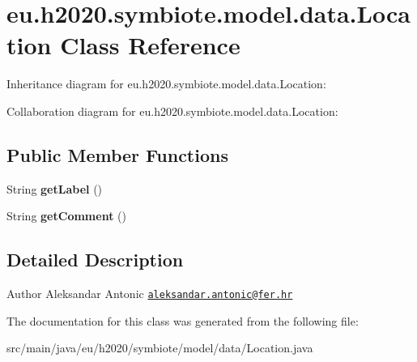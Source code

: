 \hypertarget{classeu_1_1h2020_1_1symbiote_1_1model_1_1data_1_1Location}{}\section{eu.\+h2020.\+symbiote.\+model.\+data.\+Location Class Reference}
\label{classeu_1_1h2020_1_1symbiote_1_1model_1_1data_1_1Location}


Inheritance diagram for eu.\+h2020.\+symbiote.\+model.\+data.\+Location\+:


Collaboration diagram for eu.\+h2020.\+symbiote.\+model.\+data.\+Location\+:
\subsection*{Public Member Functions}
\begin{DoxyCompactItemize}
\item 
\mbox{\label{classeu_1_1h2020_1_1symbiote_1_1model_1_1data_1_1Location_af830749fcbcfaebf739c3cda6042581c}} 
String {\bfseries get\+Label} ()
\item 
\mbox{\label{classeu_1_1h2020_1_1symbiote_1_1model_1_1data_1_1Location_af3ba96cee36a70ebd103938a92e2db95}} 
String {\bfseries get\+Comment} ()
\end{DoxyCompactItemize}


\subsection{Detailed Description}
\begin{DoxyAuthor}{Author}
Aleksandar Antonic \href{mailto:aleksandar.antonic@fer.hr}{\tt aleksandar.\+antonic@fer.\+hr} 
\end{DoxyAuthor}


The documentation for this class was generated from the following file\+:\begin{DoxyCompactItemize}
\item 
src/main/java/eu/h2020/symbiote/model/data/Location.\+java\end{DoxyCompactItemize}
